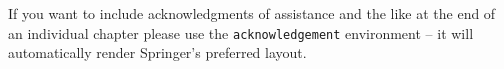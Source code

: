 \documentclass[graybox]{svmult}
\begin{document}

%
\begin{acknowledgement}
If you want to include acknowledgments of assistance and the like at the end of an individual chapter please use the \verb|acknowledgement| environment -- it will automatically render Springer's preferred layout.
\end{acknowledgement}
%

% 


\end{document}
